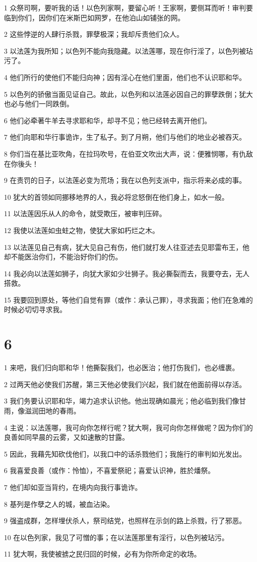 \par 1 众祭司啊，要听我的话！以色列家啊，要留心听！王家啊，要侧耳而听！审判要临到你们，因你们在米斯巴如网罗，在他泊山如铺张的网。
\par 2 这些悖逆的人肆行杀戮，罪孽极深；我却斥责他们众人。
\par 3 以法莲为我所知；以色列不能向我隐藏。以法莲哪，现在你行淫了，以色列被玷污了。
\par 4 他们所行的使他们不能归向神；因有淫心在他们里面，他们也不认识耶和华。
\par 5 以色列的骄傲当面见证自己。故此，以色列和以法莲必因自己的罪孽跌倒；犹大也必与他们一同跌倒。
\par 6 他们必牵著牛羊去寻求耶和华，却寻不见；他已经转去离开他们。
\par 7 他们向耶和华行事诡诈，生了私子。到了月朔，他们与他们的地业必被吞灭。
\par 8 你们当在基比亚吹角，在拉玛吹号，在伯亚文吹出大声，说：便雅悯哪，有仇敌在你後头！
\par 9 在责罚的日子，以法莲必变为荒场；我在以色列支派中，指示将来必成的事。
\par 10 犹大的首领如同挪移地界的人，我必将忿怒倒在他们身上，如水一般。
\par 11 以法莲因乐从人的命令，就受欺压，被审判压碎。
\par 12 我使以法莲如虫蛀之物，使犹大家如朽烂之木。
\par 13 以法莲见自己有病，犹大见自己有伤，他们就打发人往亚述去见耶雷布王，他却不能医治你们，不能治好你们的伤。
\par 14 我必向以法莲如狮子，向犹大家如少壮狮子。我必撕裂而去，我要夺去，无人搭救。
\par 15 我要回到原处，等他们自觉有罪（或作：承认己罪），寻求我面；他们在急难的时候必切切寻求我。

\chapter{6}

\par 1 来吧，我们归向耶和华！他撕裂我们，也必医治；他打伤我们，也必缠裹。
\par 2 过两天他必使我们苏醒，第三天他必使我们兴起，我们就在他面前得以存活。
\par 3 我们务要认识耶和华，竭力追求认识他。他出现确如晨光；他必临到我们像甘雨，像滋润田地的春雨。
\par 4 主说：以法莲哪，我可向你怎样行呢？犹大啊，我可向你怎样做呢？因为你们的良善如同早晨的云雾，又如速散的甘露。
\par 5 因此，我藉先知砍伐他们，以我口中的话杀戮他们；我施行的审判如光发出。
\par 6 我喜爱良善（或作：怜恤），不喜爱祭祀；喜爱认识神，胜於燔祭。
\par 7 他们却如亚当背约，在境内向我行事诡诈。
\par 8 基列是作孽之人的城，被血沾染。
\par 9 强盗成群，怎样埋伏杀人，祭司结党，也照样在示剑的路上杀戮，行了邪恶。
\par 10 在以色列家，我见了可憎的事；在以法莲那里有淫行，以色列被玷污。
\par 11 犹大啊，我使被掳之民归回的时候，必有为你所命定的收场。

